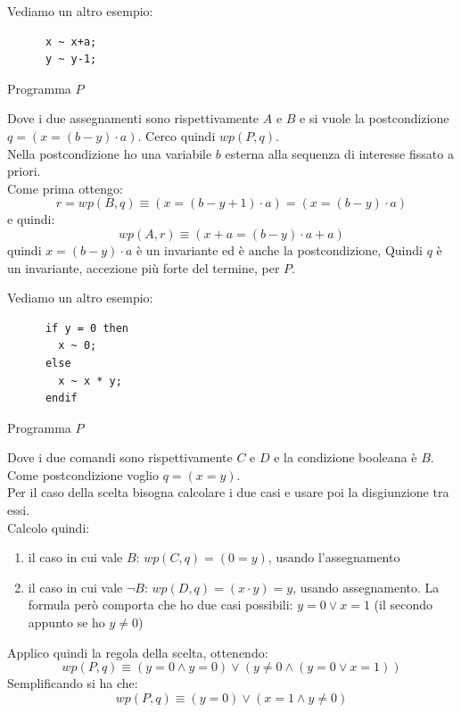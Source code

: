 \documentclass[a4paper,12pt, oneside]{book}
\begin{document}
\begin{esempio}
   Vediamo un altro esempio:
  \begin{listing}[H]
    \begin{lstlisting}
      x ~ x+a;
      y ~ y-1;
    \end{lstlisting}
    \caption{Programma $P$}
  \end{listing}
Dove i due assegnamenti sono rispettivamente $A$ e $B$ e si vuole la
postcondizione $q=(x=(b-y)\cdot a)$. Cerco quindi $wp(P,q)$.\\
Nella postcondizione ho una variabile $b$ esterna alla sequenza di interesse
fissato a priori.\\
Come prima ottengo:
\[r=wp(B,q)\equiv(x=(b-y+1)\cdot a)=(x=(b-y)\cdot a)\]
e quindi:
\[wp(A,r)\equiv(x+a=(b-y)\cdot a+a)\]
quindi $x=(b-y)\cdot a$ è un invariante ed è anche la postcondizione, Quindi $q$
è un invariante, accezione più forte del termine, per $P$.
\end{esempio}
\begin{esempio}
  Vediamo un altro esempio:
  \begin{listing}[H]
    \begin{lstlisting}
      if y = 0 then
        x ~ 0;
      else
        x ~ x * y;
      endif
    \end{lstlisting}
    \caption{Programma $P$}
  \end{listing}
  Dove i due comandi sono rispettivamente $C$ e $D$ e la condizione booleana è
  $B$. Come postcondizione voglio $q=(x=y)$.\\
  Per il caso della scelta bisogna calcolare i due casi e usare poi la
  disgiunzione tra essi.\\
  Calcolo quindi:
  \begin{enumerate}
    \item il caso in cui vale $B$: $wp(C,q)=(0=y)$, usando l'assegnamento
    \item il caso in cui vale $\neg B$: $wp(D,q)=(x\cdot y)=y$, usando
    assegnamento. La formula però comporta che ho due casi possibili: $y=0\lor
    x=1$ (il secondo appunto se ho $y\neq 0$)
  \end{enumerate}
  Applico quindi la regola della scelta, ottenendo:
  \[wp(P,q)\equiv (y=0\land y=0)\lor(y\neq 0\land (y=0\lor x=1))\]
  Semplificando si ha che:
  \[wp(P,q)\equiv(y=0)\lor(x=1\land y\neq 0)\]
\end{esempio}
\end{document}
